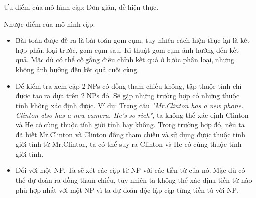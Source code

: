 \documentclass[12pt]{extarticle}
\begin{document}
				\par Ưu điểm của mô hình cặp: Đơn giản, dễ hiện thực.
				\par Nhược điểm của mô hình cặp:
					\begin{itemize}
						\item{Bài toán được đề ra là bài toán gom cụm, tuy nhiên cách hiện thực lại là kết hợp phân loại trước, gom cụm sau. Kĩ thuật gom cụm ảnh hưởng đến kết quả. Mặc dù có thể cố gắng điều chỉnh kết quả ở bước phân loại, nhưng không ảnh hưởng đến kết quả cuối cùng.}
						\item{Để kiểm tra xem cặp 2 NPs có đồng tham chiếu không, tập thuộc tính chỉ được tạo ra dựa trên 2 NPs đó. Sẽ gặp những trường hợp có những thuộc tính không xác định được. Ví dụ: Trong câu \textit{"Mr.Clinton has a new phone. Clinton also has a new camera. He’s so rich"}, ta không thể xác định Clinton và He có cùng thuộc tính giới tính hay không. Trong trường hợp đó, nếu ta đã biết Mr.Clinton và Clinton đồng tham chiếu và sử dụng được thuộc tính giới tính từ Mr.Clinton, ta có thể suy ra Clinton và He có cùng thuộc tính giới tính.}
						\item{Đối với một NP. Ta sẽ xét các cặp từ NP với các tiền từ của nó. Mặc dù có thể dự đoán ra đồng tham chiếu, tuy nhiên ta không thể xác định tiền từ nào phù hợp nhất với một NP vì ta dự đoán độc lập cặp từng tiền từ với NP.}
					\end{itemize}
\end{document}
